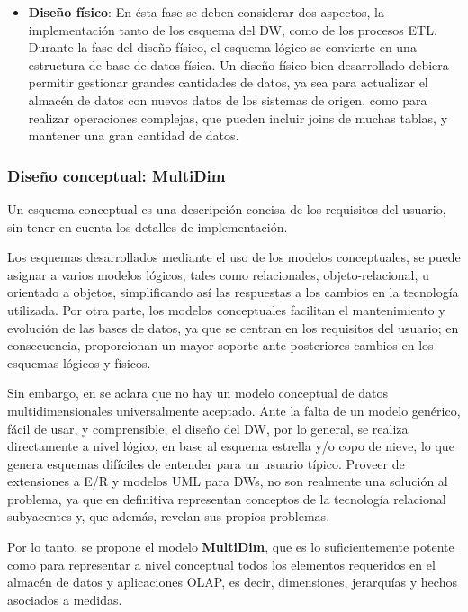 \documentclass[a4paper,11pt]{article}
\begin{document}
\begin{itemize}
      \item \textbf{Diseño físico}:
      En ésta fase se deben considerar dos aspectos, la implementación tanto de los esquema del DW, como de los procesos ETL.
      Durante la fase del diseño físico, el esquema lógico se convierte en una estructura de base de datos física.
      Un diseño físico bien desarrollado debiera permitir gestionar grandes cantidades de datos, ya sea para actualizar el almacén de datos con nuevos datos de los
      sistemas de origen, como para realizar operaciones complejas, que pueden incluir joins de muchas tablas, y mantener una gran cantidad de datos.
      \end{itemize}      
      
      \subsubsection{Diseño conceptual: MultiDim}
      
      Un esquema conceptual es una descripción concisa de los requisitos del usuario, sin tener en cuenta los detalles de implementación.
      
      Los esquemas desarrollados mediante el uso de los modelos conceptuales, se puede asignar a varios modelos lógicos, tales como relacionales, objeto-relacional,
      u orientado a objetos, simplificando así las respuestas a los cambios en la tecnología utilizada.
      Por otra parte, los modelos conceptuales facilitan el mantenimiento y evolución de las bases de datos, ya que se centran en los requisitos del usuario;
      en consecuencia, proporcionan un mayor soporte ante posteriores cambios en los esquemas lógicos y físicos.
      
      Sin embargo, en \cite{VaismanZimanyi14} se aclara que no hay un modelo conceptual de datos multidimensionales universalmente aceptado.
      Ante la falta de un modelo genérico, fácil de usar, y comprensible, el diseño del DW, por lo general, se realiza directamente a nivel lógico, en base
      al esquema estrella y/o copo de nieve, lo que genera esquemas difíciles de entender para un usuario típico.
      Proveer de extensiones a E/R y modelos UML para DWs, no son realmente una solución al problema, ya que en definitiva representan
      conceptos de la tecnología relacional subyacentes y, que además, revelan sus propios problemas.
      
      Por lo tanto, se propone el modelo \textbf{MultiDim}, que es lo suficientemente potente como para representar a nivel conceptual
      todos los elementos requeridos en el almacén de datos y aplicaciones OLAP, es decir, dimensiones, jerarquías y hechos asociados a medidas.
      
\end{document}
